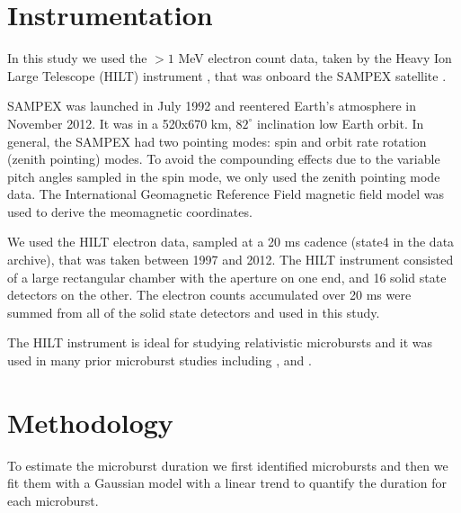 \documentclass[draft]{agujournal2019}
\begin{document}
\section{Instrumentation}\label{instrumentation}
In this study we used the $>1$ MeV electron count data, taken by the Heavy Ion Large Telescope (HILT) instrument \cite{Klecker1993}, that was onboard the SAMPEX satellite \cite{Baker1993}.

SAMPEX was launched in July 1992 and reentered Earth's atmosphere in November 2012. It was in a 520x670 km, $82^\circ$ inclination low Earth orbit. In general, the SAMPEX had two pointing modes: spin and orbit rate rotation (zenith pointing) modes. To avoid the compounding effects due to the variable pitch angles sampled in the spin mode, we only used the zenith pointing mode data. The International Geomagnetic Reference Field \cite[IGRF]{Thebault2015} magnetic field model was used to derive the meomagnetic coordinates.

We used the HILT electron data, sampled at a 20 ms cadence (state4 in the data archive), that was taken between 1997 and 2012. The HILT instrument consisted of a large rectangular chamber with the aperture on one end, and 16 solid state detectors on the other. The electron counts accumulated over 20 ms were summed from all of the solid state detectors and used in this study.

The HILT instrument is ideal for studying relativistic microbursts and it was used in many prior microburst studies including , and .

\section{Methodology}\label{methodology}

To estimate the microburst duration we first identified microbursts and then we fit them with a Gaussian model with a linear trend to quantify the duration for each microburst.
\end{document}
